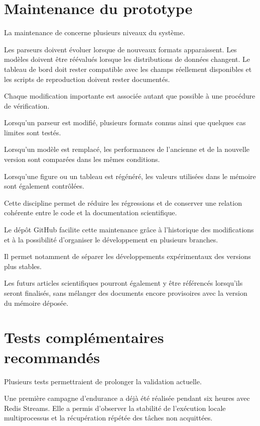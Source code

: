 \section{Maintenance du prototype}

La maintenance de \logminer{} concerne plusieurs niveaux du système.

Les parseurs doivent évoluer lorsque de nouveaux formats apparaissent. Les modèles doivent être réévalués lorsque les distributions de données changent. Le tableau de bord doit rester compatible avec les champs réellement disponibles et les scripts de reproduction doivent rester documentés.

Chaque modification importante est associée autant que possible à une procédure de vérification.

Lorsqu'un parseur est modifié, plusieurs formats connus ainsi que quelques cas limites sont testés.

Lorsqu'un modèle est remplacé, les performances de l'ancienne et de la nouvelle version sont comparées dans les mêmes conditions.

Lorsqu'une figure ou un tableau est régénéré, les valeurs utilisées dans le mémoire sont également contrôlées.

Cette discipline permet de réduire les régressions et de conserver une relation cohérente entre le code et la documentation scientifique.

Le dépôt GitHub facilite cette maintenance grâce à l'historique des modifications et à la possibilité d'organiser le développement en plusieurs branches.

Il permet notamment de séparer les développements expérimentaux des versions plus stables.

Les futurs articles scientifiques pourront également y être référencés lorsqu'ils seront finalisés, sans mélanger des documents encore provisoires avec la version du mémoire déposée.

\section{Tests complémentaires recommandés}

Plusieurs tests permettraient de prolonger la validation actuelle.

Une première campagne d'endurance a déjà été réalisée pendant six heures avec Redis Streams. Elle a permis d'observer la stabilité de l'exécution locale multiprocessus et la récupération répétée des tâches non acquittées.

